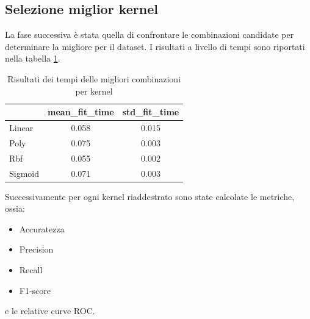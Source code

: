 \subsection{Selezione miglior kernel}
La fase successiva è stata quella di confrontare le combinazioni candidate per
determinare la migliore per il dataset. I risultati a livello di tempi sono
riportati nella tabella \ref{tab:top_time_kernels_corr}.
\begin{table}[!ht]
    \centering
    \begin{tabular}{@{}lcc@{}}
        \toprule
        \rowcolor[HTML]{EFEFEF}
        \multicolumn{1}{c}{\cellcolor[HTML]{EFEFEF}\textbf{kernel}} & \textbf{mean\_fit\_time} & \textbf{std\_fit\_time} \\ \midrule
        Linear                                                      & 0.058                    & 0.015                   \\
        Poly                                                        & 0.075                    & 0.003                   \\
        Rbf                                                         & 0.055                    & 0.002                   \\
        Sigmoid                                                     & 0.071                    & 0.003                   \\ \bottomrule
    \end{tabular}
    \caption{Risultati dei tempi delle migliori combinazioni per kernel}
    \label{tab:top_time_kernels_corr}
\end{table}

Successivamente per ogni kernel riaddestrato sono state calcolate
le metriche, ossia:
\begin{itemize}
    \item Accuratezza
    \item Precision
    \item Recall
    \item F1-score
\end{itemize}
e le relative curve ROC.

